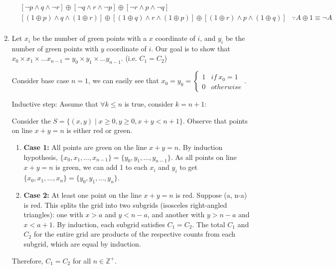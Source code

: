 \documentclass{article}
\begin{document}
\begin{enumerate}[label=(\alph*)]
\begin{align*}
               & [\neg p \land q \land \neg r] \oplus  [\neg q \land r \land \neg p] \oplus  [\neg r \land p \land \neg q]                                                                          \\
               & [(1 \oplus p) \land q \land (1 \oplus r)] \oplus  [(1 \oplus q) \land r \land (1 \oplus p)] \oplus  [(1 \oplus r) \land p \land (1 \oplus q)]  & \because A \oplus 1 \equiv \neg A \\
          \end{align*}
    \item Let $x_i$ be the number of green points with a $x$ coordinate of $i$, and $y_i$ be the number of green points with $y$ coordinate of $i$. Our goal is to show that $x_0\times x_1 \times \dots x_{n-1} = y_0\times y_1 \times \dots y_{n-1}$. (i.e. $C_1 = C_2$)

          Consider base case $n=1$, we can easily see that $x_0=y_0=\begin{cases}1 & if\ x_0=1\\0 & otherwise\end{cases}$.

          Inductive step: Assume that $\forall k \leq n$ is true, consider $k=n+1$:

          Consider the $S=\{(x,y)\mid x\geq0,y\geq0,x+y<n+1\}$. Observe that points on line $x+y=n$ is either red or green.

          \begin{enumerate}
              \item \textbf{Case 1: } All points are green on the line $x+y=n$. By induction hypothesis, $\{x_0, x_1, \dots, x_{n-1}\} = \{y_0, y_1, \dots, y_{n-1}\}$. As all points on line $x+y=n$ is green, we can add 1 to each $x_i$ and $y_i$ to get $\{x_0, x_1, \dots, x_{n}\} = \{y_0, y_1, \dots, y_{n}\}$.
              \item \textbf{Case 2: } At least one point on the line $x+y=n$ is red. Suppose
                    (a, n-a) is red. This splits the grid into two subgrids (isosceles right-angled triangles): one with $x>a$ and $y<n-a$, and another with $y>n-a$ and $x<a+1$. By induction, each subgrid satisfies $C_1 = C_2$. The total $C_1$ and $C_2$ for the entire grid are products of the respective counts from each subgrid, which are equal by induction.
          \end{enumerate}

          Therefore, $C_1 = C_2$ for all $n \in \mathbb{Z}^+$.


\end{enumerate}
\end{document}
